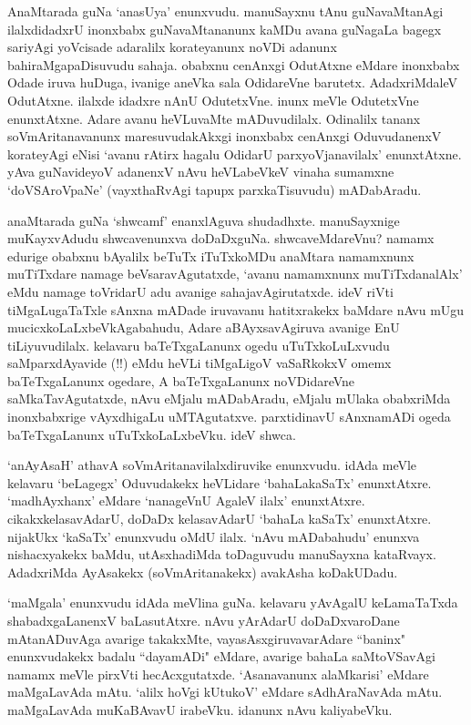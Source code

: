 AnaMtarada guNa `anasUya' enunxvudu. manuSayxnu tAnu guNavaMtanAgi ilalxdidadxrU inonxbabx guNavaMtananunx kaMDu avana guNagaLa bagegx sariyAgi 
yoVcisade adaralilx korateyanunx noVDi adanunx bahiraMgapaDisuvudu sahaja. obabxnu cenAnxgi OdutAtxne eMdare inonxbabx Odade iruva 
huDuga, ivanige aneVka sala OdidareVne barutetx. AdadxriMdaleV OdutAtxne. ilalxde idadxre nAnU OdutetxVne. inunx meVle OdutetxVne enunxtAtxne. 
Adare avanu heVLuvaMte mADuvudilalx. Odinalilx tananx soVmAritanavanunx maresuvudakAkxgi inonxbabx cenAnxgi OduvudanenxV korateyAgi eNisi `avanu 
rAtirx hagalu OdidarU parxyoVjanavilalx' enunxtAtxne. yAva guNavideyoV adanenxV nAvu heVLabeVkeV vinaha sumamxne `doVSAroVpaNe' (vayxthaRvAgi tapupx parxkaTisuvudu) mADabAradu.

anaMtarada guNa `shwcamf' enanxlAguva shudadhxte. manuSayxnige muKayxvAdudu shwcavenunxva doDaDxguNa. shwcaveMdareVnu? namamx edurige 
obabxnu bAyalilx beTuTx iTuTxkoMDu anaMtara namamxnunx muTiTxdare namage beVsaravAgutatxde, `avanu namamxnunx muTiTxdanalAlx' 
eMdu namage toVridarU adu avanige sahajavAgirutatxde. ideV riVti tiMgaLugaTaTxle sAnxna mADade iruvavanu hatitxrakekx baMdare nAvu 
mUgu mucicxkoLaLxbeVkAgabahudu, Adare aBAyxsavAgiruva avanige EnU tiLiyuvudilalx. kelavaru baTeTxgaLanunx ogedu uTuTxkoLuLxvudu 
saMparxdAyavide (!!) eMdu heVLi tiMgaLigoV vaSaRkokxV omemx baTeTxgaLanunx ogedare, A baTeTxgaLanunx noVDidareVne saMkaTavAgutatxde, nAvu eMjalu 
mADabAradu, eMjalu mUlaka obabxriMda inonxbabxrige vAyxdhigaLu uMTAgutatxve. parxtidinavU sAnxnamADi ogeda baTeTxgaLanunx uTuTxkoLaLxbeVku. ideV shwca.

`anAyAsaH' athavA soVmAritanavilalxdiruvike enunxvudu. idAda meVle kelavaru `beLagegx' Oduvudakekx heVLidare `bahaLakaSaTx' enunxtAtxre. 
`madhAyxhanx' eMdare `nanageVnU AgaleV ilalx' enunxtAtxre. cikakxkelasavAdarU, doDaDx kelasavAdarU `bahaLa kaSaTx' enunxtAtxre. nijakUkx `kaSaTx' enunxvudu oMdU ilalx. `nAvu 
mADabahudu' enunxva nishacxyakekx baMdu, utAsxhadiMda toDaguvudu manuSayxna kataRvayx. AdadxriMda AyAsakekx  (soVmAritanakekx) avakAsha koDakUDadu.

`maMgala' enunxvudu idAda meVlina guNa. kelavaru yAvAgalU keLamaTaTxda shabadxgaLanenxV baLasutAtxre. nAvu yArAdarU doDaDxvaroDane mAtanADuvAga 
avarige takakxMte, vayasAsxgiruvavarAdare ``baninx" enunxvudakekx badalu ``dayamADi" eMdare, avarige bahaLa saMtoVSavAgi namamx meVle pirxVti hecAcxgutatxde. 
`Asanavanunx alaMkarisi' eMdare maMgaLavAda mAtu. `alilx hoVgi kUtukoV' eMdare sAdhAraNavAda mAtu. maMgaLavAda muKaBAvavU irabeVku. idanunx nAvu kaliyabeVku.

